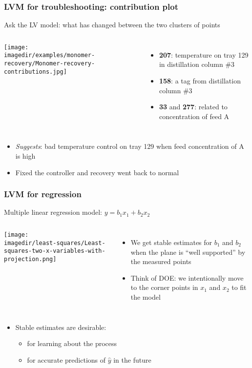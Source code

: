 \begin{frame}\frametitle{LVM for troubleshooting: contribution plot}

	Ask the LV model: what has changed between the two clusters of points
	\begin{columns}[c]
			\begin{center}
				\texttt{[image: \\imagedir/examples/monomer-recovery/Monomer-recovery-contributions.jpg]} 
			\end{center}
			\vfill
			\begin{itemize}
				\item	\textbf{207}: temperature on tray 129 in distillation column \#3
				\item	\textbf{158}: a tag from distillation column \#3
				\item	\textbf{33} and \textbf{277}: related to concentration of feed A
			\end{itemize}
	\end{columns}
	\begin{itemize}
		\item	\emph{Suggests}: bad temperature control on tray 129 when feed concentration of A is high
		\item	Fixed the controller and recovery went back to normal  
	\end{itemize}
\end{frame}

\begin{frame}\frametitle{LVM for regression}

	Multiple linear regression model: $y = b_1x_1 + b_2x_2$
	\begin{columns}
		\column{6cm}
		\texttt{[image: \\imagedir/least-squares/Least-squares-two-x-variables-with-projection.png]} \column{4cm}
		\begin{itemize}
			\item	We get stable estimates for $b_1$ and $b_2$ when the plane is ``well supported'' by the measured points
			\item	Think of DOE: we intentionally move to the corner points in $x_1$ and $x_2$ to fit the model
		\end{itemize}
	\end{columns}
	\begin{itemize}
		\item	Stable estimates are desirable:
		\begin{itemize}
			\item	for learning about the process
			\item	for accurate predictions of $\hat{y}$ in the future
		\end{itemize}
	\end{itemize}
\end{frame}

